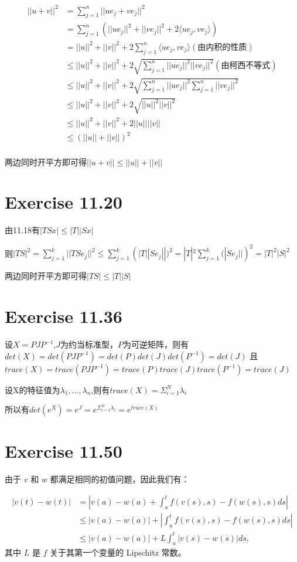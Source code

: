 \documentclass[twoside,a4paper]{article}
\begin{document}
\begin{align}
  ||u+v||^2&= \sum_{j=1}^n||ue_j+ve_j||^2\\
  &= \sum_{j=1}^n(||ue_j||^2+||ve_j||^2+2\langle ue_j,ve_j\rangle)\\
  &=||u||^2+||v||^2+2\sum_{j=1}^n\langle ue_j,ve_j\rangle(\mbox{由内积的性质})\\
  &\le ||u||^2+||v||^2+2\sqrt{\sum_{j=1}^n||ue_j||^2||ve_j||^2}(\mbox{由柯西不等式})\\
  &\le ||u||^2+||v||^2+2\sqrt{\sum_{j=1}^n||ue_j||^2\sum_{j=1}^n||ve_j||^2}\\
  &\le ||u||^2+||v||^2+2\sqrt{||u||^2||v||^2}\\
  &\le ||u||^2+||v||^2+2||u||||v||\\
  &\le (||u||+||v||)^2\\
\end{align}

两边同时开平方即可得$||u+v||\le ||u||+||v||$


\section{Exercise 11.20}

由11.18有$|TSx|\le|T||Sx|$

则$|TS|^2=\sum_{j=1}^k||TSe_j||^2\le\sum_{j=1}^k(|T||Se_j||)^2=|T|^2\sum_{j=1}^k(|Se_j||)^2=|T|^2|S|^2$

两边同时开平方即可得$|TS|\le|T||S|$

\section{Exercise 11.36}

设$X=PJP^{-1}$,$J$为约当标准型，$P$为可逆矩阵，则有$det(X)=det(PJP^{-1})=det(P)det(J)det(P^{-1})=det(J)$
且$trace(X)=trace(PJP^{-1})=trace(P)trace(J)trace(P^{-1})=trace(J)$

设X的特征值为$\lambda_1,\dots,\lambda_n$,则有$trace(X)=\Sigma_{i=1}^N\lambda_i$

所以有$det(e^{X})=e^{J}=e^{\Sigma_{i=1}^N\lambda_i}=e^{trace(X)}$

\section{Exercise 11.50}
由于 $v$ 和 $w$ 都满足相同的初值问题，因此我们有：

$$\begin{aligned}
|v(t) - w(t)| &= |v(a) - w(a) + \int_a^t f(v(s),s) - f(w(s),s)ds| \\
&\leq |v(a) - w(a)| + \left|\int_a^t f(v(s),s) - f(w(s),s)ds\right| \\
&\leq |v(a) - w(a)| + L\int_a^t |v(s) - w(s)|ds,
\end{aligned}$$
其中 $L$ 是 $f$ 关于其第一个变量的 Lipschitz 常数。 
\end{document}

